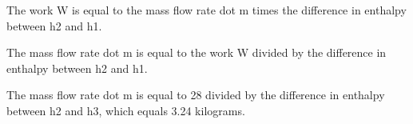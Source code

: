 The work W is equal to the mass flow rate dot m times the difference in enthalpy between h2 and h1.

The mass flow rate dot m is equal to the work W divided by the difference in enthalpy between h2 and h1.

The mass flow rate dot m is equal to 28 divided by the difference in enthalpy between h2 and h3, which equals 3.24 kilograms.